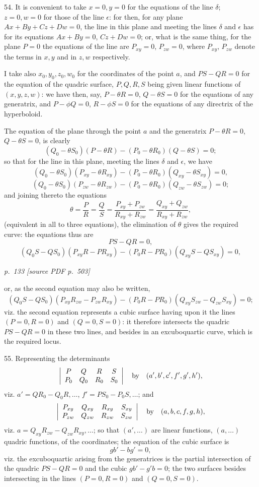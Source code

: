 \documentclass[11pt,a4paper]{article}
\newcommand{\sourcepage}[2]{%
  \bigskip
  \noindent\textit{p.~#1 [source PDF p.~#2]}%
  \par\smallskip
}
\begin{document}
54. It is convenient to take $x=0,y=0$ for the equations of the line $\delta$;
$z=0,w=0$ for those of the line $\epsilon$: for then, for any plane
$Ax+By+Cz+Dw=0$, the line in this plane and meeting the lines $\delta$ and
$\epsilon$ has for its equations $Ax+By=0$, $Cz+Dw=0$; or, what is the same thing,
for the plane $P=0$ the equations of the line are
$P_{xy}=0$, $P_{zw}=0$, where $P_{xy}$, $P_{zw}$ denote the terms in $x,y$ and
in $z,w$ respectively.

I take also $x_0,y_0,z_0,w_0$ for the coordinates of the point $a$, and
$PS-QR=0$ for the equation of the quadric surface, $P,Q,R,S$ being given linear
functions of $(x,y,z,w)$: we have then, say,
$P-\theta R=0$, $Q-\theta S=0$ for the equations of any generatrix, and
$P-\phi Q=0$, $R-\phi S=0$ for the equations of any directrix of the hyperboloid.

The equation of the plane through the point $a$ and the generatrix
$P-\theta R=0$, $Q-\theta S=0$, is clearly
\[
(Q_0-\theta S_0)(P-\theta R)-(P_0-\theta R_0)(Q-\theta S)=0;
\]
so that for the line in this plane, meeting the lines $\delta$ and $\epsilon$, we have
\[
(Q_0-\theta S_0)(P_{xy}-\theta R_{xy})
-(P_0-\theta R_0)(Q_{xy}-\theta S_{xy})=0,
\]
\[
(Q_0-\theta S_0)(P_{zw}-\theta R_{zw})
-(P_0-\theta R_0)(Q_{zw}-\theta S_{zw})=0;
\]
and joining thereto the equations
\[
\theta=\frac{P}{R}=\frac{Q}{S}
=\frac{P_{xy}+P_{zw}}{R_{xy}+R_{zw}}
=\frac{Q_{xy}+Q_{zw}}{R_{xy}+R_{zw}},
\]
(equivalent in all to three equations), the elimination of $\theta$ gives the required
curve: the equations thus are
\[
PS-QR=0,
\]
\[
(Q_0S-QS_0)(P_{xy}R-PR_{xy})
-(P_0R-PR_0)(Q_{xy}S-QS_{xy})=0,
\]

\sourcepage{133}{503}
or, as the second equation may also be written,
\[
(Q_0S-QS_0)(P_{xy}R_{zw}-P_{zw}R_{xy})
-(P_0R-PR_0)(Q_{xy}S_{zw}-Q_{zw}S_{xy})=0;
\]
viz. the second equation represents a cubic surface having upon it the lines
$(P=0,R=0)$ and $(Q=0,S=0)$: it therefore intersects the quadric $PS-QR=0$ in
these two lines, and besides in an excuboquartic curve, which is the required locus.

55. Representing the determinants
\[
\left|\begin{array}{cccc}
P&Q&R&S\\
P_0&Q_0&R_0&S_0
\end{array}\right|
\quad\hbox{by}\quad (a',b',c',f',g',h'),
\]
viz. $a'=QR_0-Q_0R,\ldots$, $f'=PS_0-P_0S,\ldots$; and
\[
\left|\begin{array}{cccc}
P_{xy}&Q_{xy}&R_{xy}&S_{xy}\\
P_{zw}&Q_{zw}&R_{zw}&S_{zw}
\end{array}\right|
\quad\hbox{by}\quad (a,b,c,f,g,h),
\]
viz. $a=Q_{xy}R_{zw}-Q_{zw}R_{xy},\ldots$; so that $(a',\ldots)$ are linear
functions, $(a,\ldots)$ quadric functions, of the coordinates; the equation of the
cubic surface is
\[
gb'-bg'=0,
\]
viz. the excuboquartic arising from the generatrices is the partial intersection of
the quadric $PS-QR=0$ and the cubic $gb'-g'b=0$; the two surfaces besides
intersecting in the lines $(P=0,R=0)$ and $(Q=0,S=0)$.
\end{document}
